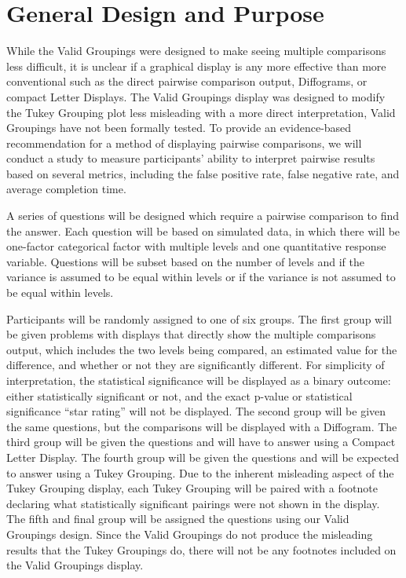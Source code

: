 \documentclass{article}
\begin{document}
\section{General Design and Purpose}

While the Valid Groupings were designed to make seeing multiple comparisons less difficult, it is unclear if a graphical display is any more effective than more conventional such as the direct pairwise comparison output, Diffograms, or compact Letter Displays. The Valid Groupings display was designed to modify the Tukey Grouping plot less misleading with a more direct interpretation, Valid Groupings have not been formally tested. To provide an evidence-based recommendation for a method of displaying pairwise comparisons, we will conduct a study to measure participants' ability to interpret pairwise results based on several metrics, including the false positive rate, false negative rate, and average completion time.

A series of questions will be designed which require a pairwise comparison to find the answer. Each question will be based on simulated data, in which there will be one-factor categorical factor with multiple levels and one quantitative response variable. Questions will be subset based on the number of levels and if the variance is assumed to be equal within levels or if the variance is not assumed to be equal within levels.

Participants will be randomly assigned to one of six groups. The first group will be given problems with displays that directly show the multiple comparisons output, which includes the two levels being compared, an estimated value for the difference, and whether or not they are significantly different. For simplicity of interpretation, the statistical significance will be displayed as a binary outcome: either statistically significant or not, and the exact p-value or statistical significance ``star rating'' will not be displayed. The second group will be given the same questions, but the comparisons will be displayed with a Diffogram. The third group will be given the questions and will have to answer using a Compact Letter Display. The fourth group will be given the questions and will be expected to answer using a Tukey Grouping. Due to the inherent misleading aspect of the Tukey Grouping display, each Tukey Grouping will be paired with a footnote declaring what statistically significant pairings were not shown in the display. The fifth and final group will be assigned the questions using our Valid Groupings design. Since the Valid Groupings do not produce the misleading results that the Tukey Groupings do, there will not be any footnotes included on the Valid Groupings display.
\end{document}
